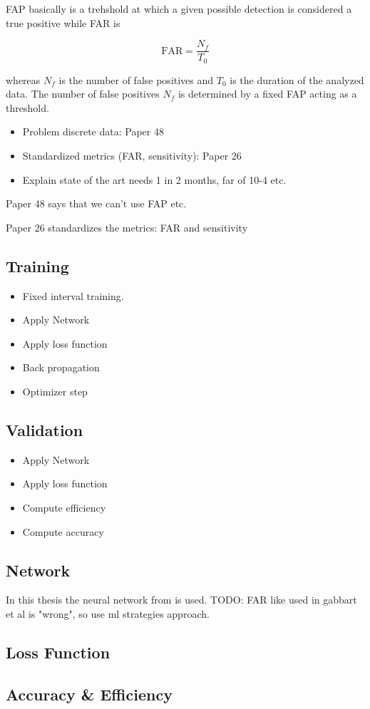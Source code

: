 FAP basically is a trehshold at which a given possible detection is considered
a true positive while FAR is 

\[
  \text{FAR} = \frac{N_f}{T_0}
\]

whereas $N_f$ is the number of false positives and $T_0$ is the duration of the
analyzed data. The number of false positives $N_f$ is determined by a fixed
FAP acting as a threshold.






\begin{itemize}
  \item Problem discrete data: Paper 48
  \item Standardized metrics (FAR, sensitivity): Paper 26
  \item Explain state of the art needs 1 in 2 months, far of 10-4 etc.
\end{itemize}
Paper 48 says that we can't use FAP etc.

Paper 26 standardizes the metrics: FAR and sensitivity

\subsection{Training}
\begin{itemize}
  \item Fixed interval training.
  \item Apply Network
  \item Apply loss function
  \item Back propagation
  \item Optimizer step
\end{itemize}

\subsection{Validation}
\begin{itemize}
  \item Apply Network
  \item Apply loss function
  \item Compute efficiency 
  \item Compute accuracy
\end{itemize}

\subsection{Network}
In this thesis the neural network from \cite{schaefer2021training} is used.
TODO: FAR like used in gabbart et al is "wrong", so use ml strategies approach.

\subsection{Loss Function}

\subsection{Accuracy \& Efficiency}





